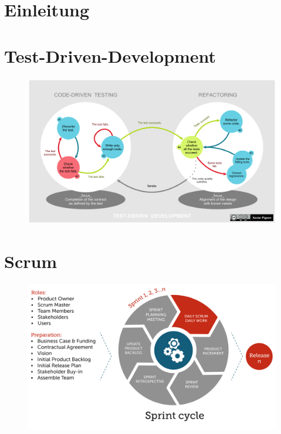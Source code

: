\documentclass[12pt,DIV14,BCOR10mm,a4paper,twoside,parskip=half-,headsepline,headinclude,english,ngerman,bibliography=totocnumbered]{scrreprt}
\begin{document}
\chapter{Einleitung}
\chapter{Test-Driven-Development}

\begin{figure}[!htb]
  \includegraphics[width=\textwidth,height=0.85\textheight,keepaspectratio]{./images/1920px-TDD_Global_Lifecycle.png}
\autocite{TDD.Picture}
\end{figure}

\chapter{Scrum}

\begin{figure}[!htb]
  \includegraphics[width=\textwidth,height=0.9\textheight,keepaspectratio]{./images/the-daily-scrum-in-the-sprint-cycle}
  \autocite{ManifestoDigital}
\end{figure}
\end{document}

